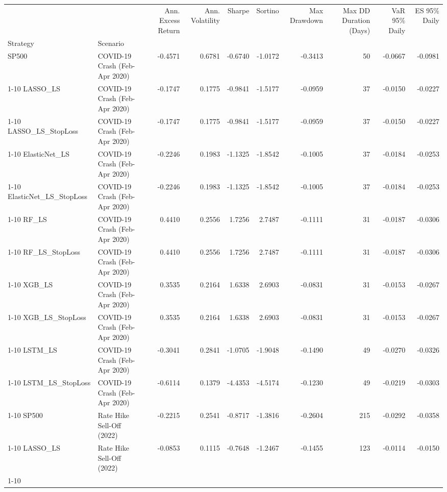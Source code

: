 \begin{tabular}{llrrrrrrrr}
\toprule
 &  & Ann. Excess Return & Ann. Volatility & Sharpe & Sortino & Max Drawdown & Max DD Duration (Days) & VaR 95\% Daily & ES 95\% Daily \\
Strategy & Scenario &  &  &  &  &  &  &  &  \\
\midrule
SP500 & COVID-19 Crash (Feb-Apr 2020) & -0.4571 & 0.6781 & -0.6740 & -1.0172 & -0.3413 & 50 & -0.0667 & -0.0981 \\
\cline{1-10}
LASSO\_LS & COVID-19 Crash (Feb-Apr 2020) & -0.1747 & 0.1775 & -0.9841 & -1.5177 & -0.0959 & 37 & -0.0150 & -0.0227 \\
\cline{1-10}
LASSO\_LS\_StopLoss & COVID-19 Crash (Feb-Apr 2020) & -0.1747 & 0.1775 & -0.9841 & -1.5177 & -0.0959 & 37 & -0.0150 & -0.0227 \\
\cline{1-10}
ElasticNet\_LS & COVID-19 Crash (Feb-Apr 2020) & -0.2246 & 0.1983 & -1.1325 & -1.8542 & -0.1005 & 37 & -0.0184 & -0.0253 \\
\cline{1-10}
ElasticNet\_LS\_StopLoss & COVID-19 Crash (Feb-Apr 2020) & -0.2246 & 0.1983 & -1.1325 & -1.8542 & -0.1005 & 37 & -0.0184 & -0.0253 \\
\cline{1-10}
RF\_LS & COVID-19 Crash (Feb-Apr 2020) & 0.4410 & 0.2556 & 1.7256 & 2.7487 & -0.1111 & 31 & -0.0187 & -0.0306 \\
\cline{1-10}
RF\_LS\_StopLoss & COVID-19 Crash (Feb-Apr 2020) & 0.4410 & 0.2556 & 1.7256 & 2.7487 & -0.1111 & 31 & -0.0187 & -0.0306 \\
\cline{1-10}
XGB\_LS & COVID-19 Crash (Feb-Apr 2020) & 0.3535 & 0.2164 & 1.6338 & 2.6903 & -0.0831 & 31 & -0.0153 & -0.0267 \\
\cline{1-10}
XGB\_LS\_StopLoss & COVID-19 Crash (Feb-Apr 2020) & 0.3535 & 0.2164 & 1.6338 & 2.6903 & -0.0831 & 31 & -0.0153 & -0.0267 \\
\cline{1-10}
LSTM\_LS & COVID-19 Crash (Feb-Apr 2020) & -0.3041 & 0.2841 & -1.0705 & -1.9048 & -0.1490 & 49 & -0.0270 & -0.0326 \\
\cline{1-10}
LSTM\_LS\_StopLoss & COVID-19 Crash (Feb-Apr 2020) & -0.6114 & 0.1379 & -4.4353 & -4.5174 & -0.1230 & 49 & -0.0219 & -0.0303 \\
\cline{1-10}
SP500 & Rate Hike Sell-Off (2022) & -0.2215 & 0.2541 & -0.8717 & -1.3816 & -0.2604 & 215 & -0.0292 & -0.0358 \\
\cline{1-10}
LASSO\_LS & Rate Hike Sell-Off (2022) & -0.0853 & 0.1115 & -0.7648 & -1.2467 & -0.1455 & 123 & -0.0114 & -0.0150 \\
\cline{1-10}

\end{tabular}
